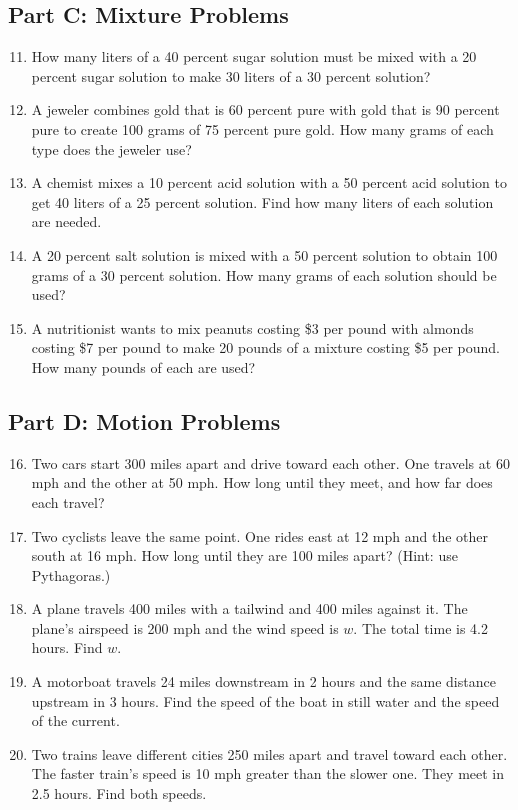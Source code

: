 \documentclass[12pt]{article}
\begin{document}
\subsection*{Part C: Mixture Problems}
\begin{enumerate}
  \setcounter{enumi}{10}
  \item How many liters of a 40 percent sugar solution must be mixed with a 20 percent sugar solution to make 30 liters of a 30 percent solution?
  \item A jeweler combines gold that is 60 percent pure with gold that is 90 percent pure to create 100 grams of 75 percent pure gold. How many grams of each type does the jeweler use?
  \item A chemist mixes a 10 percent acid solution with a 50 percent acid solution to get 40 liters of a 25 percent solution. Find how many liters of each solution are needed.
  \item A 20 percent salt solution is mixed with a 50 percent solution to obtain 100 grams of a 30 percent solution. How many grams of each solution should be used?
  \item A nutritionist wants to mix peanuts costing \$3 per pound with almonds costing \$7 per pound to make 20 pounds of a mixture costing \$5 per pound. How many pounds of each are used?
\end{enumerate}

\subsection*{Part D: Motion Problems}
\begin{enumerate}
  \setcounter{enumi}{15}
  \item Two cars start 300 miles apart and drive toward each other. One travels at 60 mph and the other at 50 mph. How long until they meet, and how far does each travel?
  \item Two cyclists leave the same point. One rides east at 12 mph and the other south at 16 mph. How long until they are 100 miles apart? (Hint: use Pythagoras.)
  \item A plane travels 400 miles with a tailwind and 400 miles against it. The plane’s airspeed is 200 mph and the wind speed is \(w\). The total time is 4.2 hours. Find \(w\).
  \item A motorboat travels 24 miles downstream in 2 hours and the same distance upstream in 3 hours. Find the speed of the boat in still water and the speed of the current.
  \item Two trains leave different cities 250 miles apart and travel toward each other. The faster train’s speed is 10 mph greater than the slower one. They meet in 2.5 hours. Find both speeds.
\end{enumerate}
\end{document}
